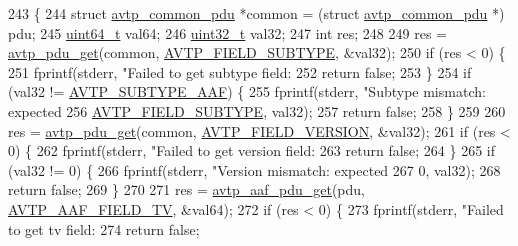 \begin{DoxyCode}
243 \{
244     \textcolor{keyword}{struct }\hyperlink{structavtp__common__pdu}{avtp\_common\_pdu} *common = (\textcolor{keyword}{struct }\hyperlink{structavtp__common__pdu}{avtp\_common\_pdu} *) pdu;
245     \hyperlink{parse_8c_aec6fcb673ff035718c238c8c9d544c47}{uint64\_t} val64;
246     \hyperlink{parse_8c_a6eb1e68cc391dd753bc8ce896dbb8315}{uint32\_t} val32;
247     \textcolor{keywordtype}{int} res;
248 
249     res = \hyperlink{avtp_8h_a5834d6469319080f4b98b71db402a672}{avtp\_pdu\_get}(common, \hyperlink{avtp_8h_ae8ac82f40d36ba8c7a71a451a1d7ddf0a9e663acceb0e8f7e7f4ac33bff00512c}{AVTP\_FIELD\_SUBTYPE}, &val32);
250     \textcolor{keywordflow}{if} (res < 0) \{
251         fprintf(stderr, \textcolor{stringliteral}{"Failed to get subtype field: %
252         \textcolor{keywordflow}{return} \textcolor{keyword}{false};
253     \}
254     \textcolor{keywordflow}{if} (val32 != \hyperlink{openavb__map__aaf__audio_8c_a246903796b0d2d8596659143992f1c3b}{AVTP\_SUBTYPE\_AAF}) \{
255         fprintf(stderr, \textcolor{stringliteral}{"Subtype mismatch: expected %
256                         \hyperlink{avtp_8h_ae8ac82f40d36ba8c7a71a451a1d7ddf0a9e663acceb0e8f7e7f4ac33bff00512c}{AVTP\_FIELD\_SUBTYPE}, val32);
257         \textcolor{keywordflow}{return} \textcolor{keyword}{false};
258     \}
259 
260     res = \hyperlink{avtp_8h_a5834d6469319080f4b98b71db402a672}{avtp\_pdu\_get}(common, \hyperlink{avtp_8h_ae8ac82f40d36ba8c7a71a451a1d7ddf0a7e7c49ba84d0ff1d6f92707dd34cd364}{AVTP\_FIELD\_VERSION}, &val32);
261     \textcolor{keywordflow}{if} (res < 0) \{
262         fprintf(stderr, \textcolor{stringliteral}{"Failed to get version field: %
263         \textcolor{keywordflow}{return} \textcolor{keyword}{false};
264     \}
265     \textcolor{keywordflow}{if} (val32 != 0) \{
266         fprintf(stderr, \textcolor{stringliteral}{"Version mismatch: expected %
267                                 0, val32);
268         \textcolor{keywordflow}{return} \textcolor{keyword}{false};
269     \}
270 
271     res = \hyperlink{avtp__aaf_8h_acc4c927b036e22def8e6b6beb3ac6026}{avtp\_aaf\_pdu\_get}(pdu, \hyperlink{avtp__aaf_8h_a7eaee6c1ebc806c0401dbe7b14cd22dba490dfd07398cccbefac45e6a58692eab}{AVTP\_AAF\_FIELD\_TV}, &val64);
272     \textcolor{keywordflow}{if} (res < 0) \{
273         fprintf(stderr, \textcolor{stringliteral}{"Failed to get tv field: %
274         \textcolor{keywordflow}{return} \textcolor{keyword}{false};
}}}}}
\end{DoxyCode}
